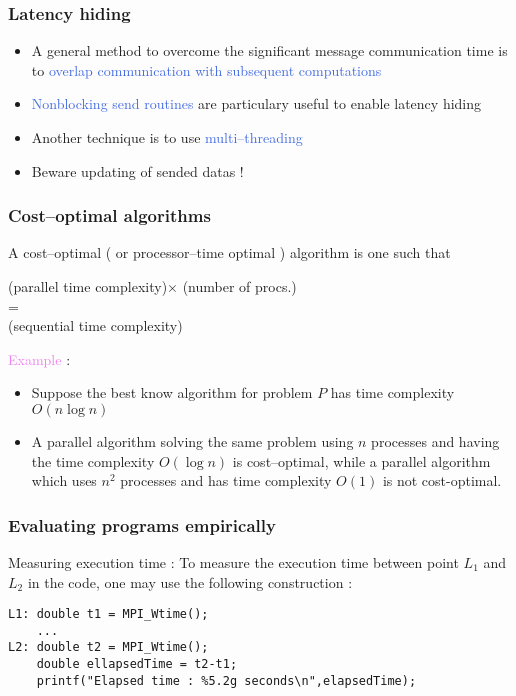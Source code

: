 \documentclass{beamer}
\begin{document}
\begin{frame}
\frametitle{Latency hiding}

\begin{itemize}
\item A general method to overcome the significant message
  communication time is to \textcolor{royalblue}{overlap
    communication with subsequent computations}
\item \textcolor{royalblue}{Nonblocking send routines}
  are particulary useful to enable latency hiding
\item Another technique is to use \textcolor{royalblue}{multi--threading}
\item Beware updating of sended datas !
\end{itemize}
\end{frame}

\begin{frame}
\frametitle{Cost--optimal algorithms}

A \alert{cost--optimal} ( or \alert{processor--time optimal} )
algorithm is one such that
\begin{center}
{\small
(parallel time complexity)$\times$ (number of procs.)\\
 =
\\
(sequential time complexity)
}
\end{center}
\textcolor{violet}{Example} :
\begin{itemize}
\item Suppose the best know algorithm for problem $P$
  has time complexity $O(n\log n)$
\item A parallel algorithm solving the same problem using $n$ 
processes and having the time complexity $O(\log n)$ is 
cost--optimal, while a parallel algorithm which uses
$n^{2}$ processes and has time complexity
$O(1)$ is not cost-optimal.
\end{itemize}
\end{frame}

\begin{frame}[fragile]
\frametitle{Evaluating programs empirically}

\alert{Measuring execution time} : To measure
the execution time between point $L_{1}$ and
$L_{2}$ in the code, one may use the following construction :
\begin{lstlisting}
L1: double t1 = MPI_Wtime();
    ...
L2: double t2 = MPI_Wtime();
    double ellapsedTime = t2-t1;
    printf("Elapsed time : %5.2g seconds\n",elapsedTime);
\end{lstlisting}
\end{frame}
\end{document}
